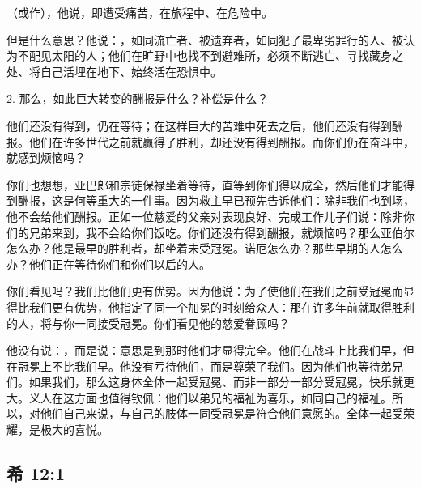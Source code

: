 （或作），他说，即遭受痛苦，在旅程中、在危险中。\par

但是什么意思？他说：，如同流亡者、被遗弃者，如同犯了最卑劣罪行的人、被认为不配见太阳的人；他们在旷野中也找不到避难所，必须不断逃亡、寻找藏身之处、将自己活埋在地下、始终活在恐惧中。\par

2. 那么，如此巨大转变的酬报是什么？补偿是什么？\par

他们还没有得到，仍在等待；在这样巨大的苦难中死去之后，他们还没有得到酬报。他们在许多世代之前就赢得了胜利，却还没有得到酬报。而你们仍在奋斗中，就感到烦恼吗？\par

你们也想想，亚巴郎和宗徒保禄坐着等待，直等到你们得以成全，然后他们才能得到酬报，这是何等重大的一件事。因为救主早已预先告诉他们：除非我们也到场，他不会给他们酬报。正如一位慈爱的父亲对表现良好、完成工作儿子们说：除非你们的兄弟来到，我不会给你们饭吃。你们还没有得到酬报，就烦恼吗？那么亚伯尔怎么办？他是最早的胜利者，却坐着未受冠冕。诺厄怎么办？那些早期的人怎么办？他们正在等待你们和你们以后的人。\par

你们看见吗？我们比他们更有优势。因为他说：为了使他们在我们之前受冠冕而显得比我们更有优势，他指定了同一个加冕的时刻给众人：那在许多年前就取得胜利的人，将与你一同接受冠冕。你们看见他的慈爱眷顾吗？\par

他没有说：，而是说：意思是到那时他们才显得完全。他们在战斗上比我们早，但在冠冕上不比我们早。他没有亏待他们，而是尊荣了我们。因为他们也等待弟兄们。如果我们，那么这身体全体一起受冠冕、而非一部分一部分受冠冕，快乐就更大。义人在这方面也值得钦佩：他们以弟兄的福祉为喜乐，如同自己的福祉。所以，对他们自己来说，与自己的肢体一同受冠冕是符合他们意愿的。全体一起受荣耀，是极大的喜悦。\par


\subsection{希 12:1}

